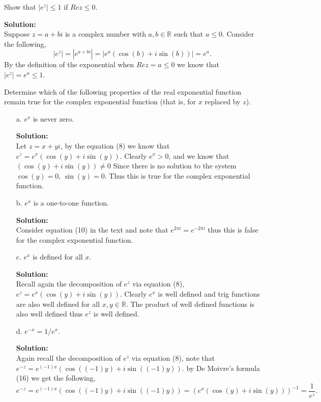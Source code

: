 \documentclass[12pt]{article}
\makeatletter
\theoremstyle{homework}
\newenvironment{exercise}[1]
{\def\@currentlabel{#1}\exercisecore}
{\endexercisecore}
\newcommand{\localhead}[1]{\par\smallskip\noindent\textbf{#1}\nobreak\\}%
\newcommand\solution{\localhead{Solution:}}
\newcommand{\Reals}{\ensuremath{\mathbb R}}
\let\RR\Reals
\makeatother
\begin{document}
\begin{exercise}{10} Show that $|e^z| \leq 1$ if $Re z \leq 0$.\\
    \solution Suppose $z = a + bi$ is a complex number with $a, b \in \RR$ such that $a \leq 0$. Consider the following, 
    \begin{equation*}
        |e^z| = |e^{a + bi}| = |e^a(\cos(b) + i \sin(b))| = e^a.  
    \end{equation*}
    By the definition of the exponential when $Re z = a \leq 0$ we know that $|e^z| = e^a \leq 1$.    
\end{exercise}
\vspace{.5in}



\begin{exercise}{11} Determine which of the following properties of the real exponential function remain 
    true for the complex exponential function (that is, for $x$ replaced by $z$).\\
    \begin{enumerate}
        \item[a.] $e^x$ is never zero.\\
        \solution  Let $z = x + yi$, by the equation (8) we know that $e^z = e^x(\cos(y) + i\sin(y))$. Clearly 
        $e^x > 0$, and we know that $(\cos(y) + i\sin(y)) \neq 0$ Since there is no solution to the system $\cos(y) = 0$, $\sin(y) = 0$. 
        Thus this is true for the complex exponential function. 
        
        \item[b.] $e^x$ is a one-to-one function.\\
        \solution  Consider equation (10) in the text and note that $e^{2\pi i} = e^{-2\pi i}$ thus this is false for the complex exponential function.
        
        \item[c.] $e^x$ is defined for all $x$.\\
        \solution  Recall again the decomposition of $e^z$ via equation (8), $e^z = e^x(\cos(y) + i\sin(y))$. Clearly $e^x$ is well defined 
        and trig functions are also well defined for all $x,y \in \RR$. The product of well defined functions is also well defined thus $e^z$ is well defined. 

        \item[d.] $e^{-x} = 1/e^x$.\\   
        \solution  Again recall the decomposition of $e^z$ via equation (8), note that $e^{-z} = e^{(-1)x}(\cos((-1)y) + i\sin((-1)y))$. by De Moivre's formula (16) we get 
        the following, 
        \begin{equation*}
            e^{-z} = e^{(-1)x}(\cos((-1)y) + i\sin((-1)y)) = \left(e^{x}(\cos(y) + i\sin(y))\right)^{-1} = \dfrac{1}{e^z}. 
        \end{equation*}
    \end{enumerate}
\end{exercise}
\vspace{.5in}
\end{document}
